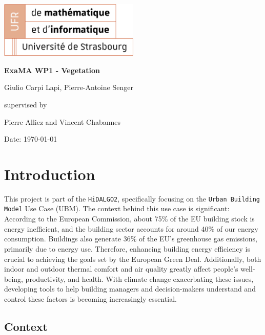 \documentclass[12pt]{article}
\begin{document}
\begin{titlepage}
\centering
\includegraphics[width=0.5\textwidth]{images/logo_ufr.png}\par\vspace{1cm}
\vspace{1.5cm}
{\huge\bfseries ExaMA WP1 - Vegetation\par}
\vspace{2cm}
{\Large Giulio Carpi Lapi, Pierre-Antoine Senger\par}
\vfill
supervised by\par
Pierre Alliez and Vincent Chabannes

\vfill

{\large Date: \today\par}
\end{titlepage}


\tableofcontents
\newpage


\section{Introduction}

This project is part of the \texttt{HiDALGO2}\cite{hidalgo2}, specifically
focusing on the \texttt{Urban Building Model} Use Case (UBM).
The context behind this use case is significant: According to the European
Commission, about 75\% of the EU building stock is energy inefficient,
and the building sector accounts for around 40\% of our energy consumption.
Buildings also generate 36\% of the EU's greenhouse gas emissions, primarily
due to energy use. Therefore, enhancing building energy efficiency is crucial
to achieving the goals set by the European Green Deal\cite{green-deal}.
Additionally, both indoor and outdoor thermal comfort and air quality greatly
affect people's well-being, productivity, and health. With climate change
exacerbating these issues, developing tools to help building managers and
decision-makers understand and control these factors is becoming increasingly
essential.\cite{urban-building-model}

\subsection{Context}
\end{document}
